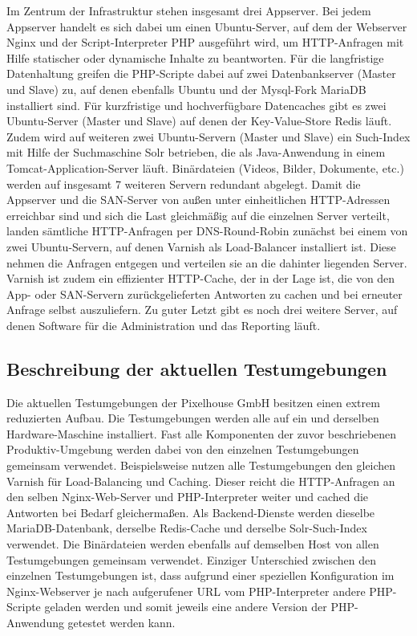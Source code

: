 Im Zentrum der Infrastruktur stehen insgesamt drei Appserver. Bei jedem Appserver handelt es sich dabei um einen Ubuntu-Server, auf dem der Webserver Nginx und der Script-Interpreter PHP ausgeführt wird, um HTTP-Anfragen mit Hilfe statischer oder dynamische Inhalte zu beantworten. Für die langfristige Datenhaltung greifen die PHP-Scripte dabei auf zwei Datenbankserver (Master und Slave) zu, auf denen ebenfalls Ubuntu und der Mysql-Fork MariaDB installiert sind. Für kurzfristige und hochverfügbare Datencaches gibt es zwei Ubuntu-Server (Master und Slave) auf denen der Key-Value-Store Redis läuft. Zudem wird auf weiteren zwei Ubuntu-Servern (Master und Slave) ein Such-Index mit Hilfe der Suchmaschine Solr betrieben, die als Java-Anwendung in einem Tomcat-Application-Server läuft. Binärdateien (Videos, Bilder, Dokumente, etc.) werden auf insgesamt 7 weiteren Servern redundant abgelegt. Damit die Appserver und die SAN-Server von außen unter einheitlichen HTTP-Adressen erreichbar sind und sich die Last gleichmäßig auf die einzelnen Server verteilt, landen sämtliche HTTP-Anfragen per DNS-Round-Robin zunächst bei einem von zwei Ubuntu-Servern, auf denen Varnish als Load-Balancer installiert ist. Diese nehmen die Anfragen entgegen und verteilen sie an die dahinter liegenden Server. Varnish ist zudem ein effizienter HTTP-Cache, der in der Lage ist, die von den App- oder SAN-Servern zurückgelieferten Antworten zu cachen und bei erneuter Anfrage selbst auszuliefern. Zu guter Letzt gibt es noch drei weitere Server, auf denen Software für die Administration und das Reporting läuft.

\subsection{Beschreibung der aktuellen Testumgebungen}

Die aktuellen Testumgebungen der Pixelhouse GmbH besitzen einen extrem reduzierten Aufbau. Die Testumgebungen werden alle auf ein und derselben Hardware-Maschine installiert. Fast alle Komponenten der zuvor beschriebenen Produktiv-Umgebung werden dabei von den einzelnen Testumgebungen gemeinsam verwendet. Beispielsweise nutzen alle Testumgebungen den gleichen Varnish für Load-Balancing und Caching. Dieser reicht die HTTP-Anfragen an den selben Nginx-Web-Server und PHP-Interpreter weiter und cached die Antworten bei Bedarf gleichermaßen. Als Backend-Dienste werden dieselbe MariaDB-Datenbank, derselbe Redis-Cache und derselbe Solr-Such-Index verwendet. Die Binärdateien werden ebenfalls auf demselben Host von allen Testumgebungen gemeinsam verwendet. Einziger Unterschied zwischen den einzelnen Testumgebungen ist, dass aufgrund einer speziellen Konfiguration im Nginx-Webserver je nach aufgerufener URL vom PHP-Interpreter andere PHP-Scripte geladen werden und somit jeweils eine andere Version der PHP-Anwendung getestet werden kann.

